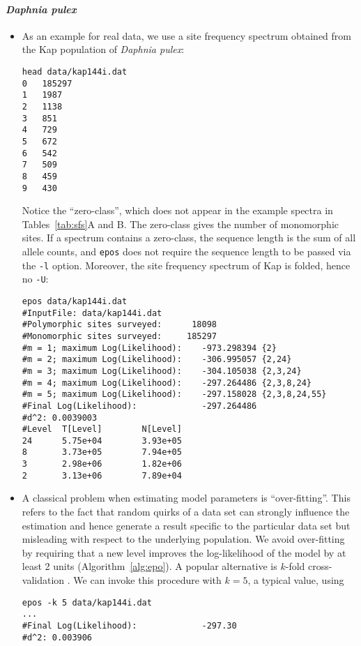 \documentclass[a4paper, english]{article}
\newcommand{\ty}{\texttt}
\begin{document}
\paragraph{\textit{Daphnia pulex}}
\begin{itemize}
\item As an example for real data, we use a site frequency spectrum obtained from
  the Kap population of \textit{Daphnia pulex}:
\begin{verbatim}
head data/kap144i.dat 
0	185297
1	1987
2	1138
3	851
4	729
5	672
6	542
7	509
8	459
9	430
\end{verbatim}
Notice the ``zero-class'', which does not appear in the example
spectra in Tables~\ref{tab:sfs}A and B. The zero-class gives the
number of monomorphic sites. If a spectrum contains a zero-class, the
sequence length is the sum of all allele counts, and \ty{epos} does not
require the sequence length to be passed via the \ty{-l}
option. Moreover, the site frequency spectrum of Kap is folded, hence
no \ty{-U}:
\begin{verbatim}
epos data/kap144i.dat 
#InputFile: data/kap144i.dat
#Polymorphic sites surveyed:      18098
#Monomorphic sites surveyed:     185297
#m = 1; maximum Log(Likelihood):    -973.298394 {2}
#m = 2; maximum Log(Likelihood):    -306.995057 {2,24}
#m = 3; maximum Log(Likelihood):    -304.105038 {2,3,24}
#m = 4; maximum Log(Likelihood):    -297.264486 {2,3,8,24}
#m = 5; maximum Log(Likelihood):    -297.158028 {2,3,8,24,55}
#Final Log(Likelihood):             -297.264486
#d^2: 0.0039003
#Level  T[Level]        N[Level]
24      5.75e+04        3.93e+05
8       3.73e+05        7.94e+05
3       2.98e+06        1.82e+06
2       3.13e+06        7.89e+04                              
\end{verbatim}
\item A classical problem when estimating model parameters is
  ``over-fitting''. This refers to the fact that random quirks of a
  data set can strongly influence the estimation and hence
  generate a result specific to the particular data set but misleading
  with respect to the underlying population. We avoid over-fitting by
  requiring that a new level improves the log-likelihood of the model
  by at least 2 units (Algorithm~\ref{alg:epo}). A popular alternative is $k$-fold
  cross-validation \citep[p. 118f]{goo16:dee}. We can invoke this
  procedure with $k=5$, a typical value, using
\begin{verbatim}
epos -k 5 data/kap144i.dat 
...
#Final Log(Likelihood):             -297.30
#d^2: 0.003906

\end{verbatim}
\end{itemize}
\end{document}
